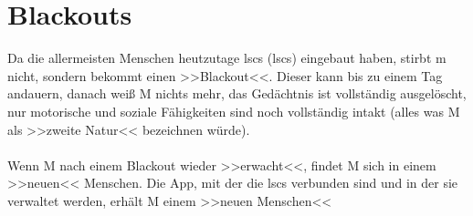 \section{Blackouts}\label{sec:blackouts}
Da die allermeisten Menschen heutzutage \aclp{lsc} (\ac{lsc}s)
eingebaut haben, stirbt \ac{m} nicht, sondern bekommt einen >>Blackout<<.
Dieser kann bis zu einem Tag andauern, danach weiß M nichts mehr, das
Gedächtnis ist vollständig ausgelöscht, nur motorische und soziale Fähigkeiten
sind noch vollständig intakt (alles was M als >>zweite Natur<< bezeichnen
würde).\\\\
%
Wenn M nach einem Blackout wieder >>erwacht<<, findet M sich in einem >>neuen<<
Menschen. Die App, mit der die \ac{lsc}s verbunden sind und in der sie verwaltet
werden, erhält M einem >>neuen Menschen<<
